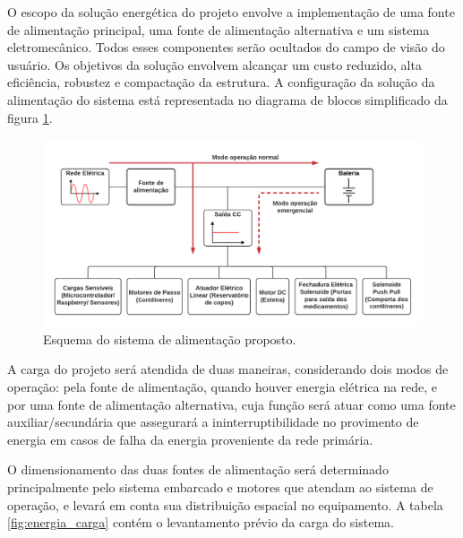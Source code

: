 O escopo da solução energética do projeto envolve a implementação de uma fonte de alimentação principal, uma fonte de alimentação alternativa e um sistema eletromecânico. Todos esses componentes serão ocultados do campo de visão do usuário. Os objetivos da solução envolvem alcançar um custo reduzido, alta eficiência, robustez e compactação da estrutura. A configuração da solução da alimentação do sistema está representada no diagrama de blocos simplificado da figura \ref{fig:energia_alimentacao}.

\begin{figure}[H]
    \centering
    \includegraphics[width=1\textwidth]{figuras/Alimentação.png}
    \caption{Esquema do sistema de alimentação proposto.}
    \label{fig:energia_alimentacao}
\end{figure}

A carga do projeto será atendida de duas maneiras, considerando dois modos de operação: pela fonte de alimentação, quando houver energia elétrica na rede, e por uma fonte de alimentação alternativa, cuja função será atuar como uma fonte auxiliar/secundária que assegurará a ininterruptibilidade no provimento de energia em casos de falha da energia proveniente da rede primária.

O dimensionamento das duas fontes de alimentação será determinado principalmente pelo sistema embarcado e motores que atendam ao sistema de operação, e levará em conta sua distribuição espacial no equipamento. A tabela \ref{fig:energia_carga} contém o levantamento prévio da carga do sistema.

 
